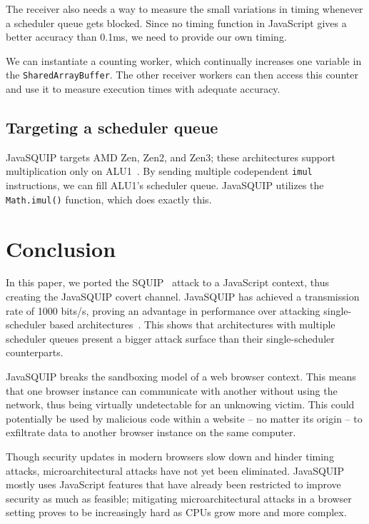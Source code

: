 \documentclass[11pt,
  titlepage=false,
]{scrreprt}
\begin{document}
The receiver also needs a way to measure the small variations in timing whenever a scheduler queue gets blocked.
Since no timing function in JavaScript gives a better accuracy than 0.1ms, we need to provide our own timing.

We can instantiate a counting worker, which continually increases one variable in the \texttt{SharedArrayBuffer}.
The other receiver workers can then access this counter and use it to measure execution times with adequate accuracy.

\section{Targeting a scheduler queue}
JavaSQUIP targets AMD Zen, Zen2, and Zen3;
these architectures support multiplication only on ALU1~\cite{AMD2020OptimizationEPYC7003}.
By sending multiple codependent \texttt{imul} instructions, we can fill ALU1's scheduler queue.
JavaSQUIP utilizes the \texttt{Math.imul()} function, which does exactly this.


\chapter{Conclusion}
\label{ch:conclusion}
In this paper, we ported the SQUIP~\cite{squip} attack to a JavaScript context, thus creating the JavaSQUIP covert channel.
JavaSQUIP has achieved a transmission rate of 1000 bits/s, proving an advantage in performance over attacking single-scheduler based architectures~\cite{Rokicki2022webport}.
This shows that architectures with multiple scheduler queues present a bigger attack surface than their single-scheduler counterparts.

JavaSQUIP breaks the sandboxing model of a web browser context.
This means that one browser instance can communicate with another without using the network, thus being virtually undetectable for an unknowing victim.
This could potentially be used by malicious code within a website -- no matter its origin -- to exfiltrate data to another browser instance on the same computer.

Though security updates in modern browsers slow down and hinder timing attacks, microarchitectural attacks have not yet been eliminated.
JavaSQUIP mostly uses JavaScript features that have already been restricted to improve security as much as feasible;
mitigating microarchitectural attacks in a browser setting proves to be increasingly hard as CPUs grow more and more complex.



\printbibliography
\end{document}
